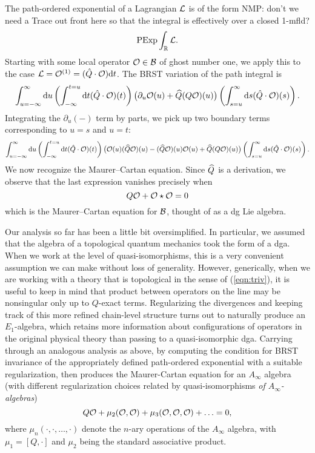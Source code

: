 \documentclass[11pt]{amsart}
\def\natalie#1{{\textcolor{green!65!black}{NMP: {#1}}}}
\begin{document}
The path-ordered exponential of a Lagrangian $\cL$ is of the form \natalie{don't we need a Trace out front here so that the integral is effectively over a closed 1-mfld?}
\[
\text{PExp} \int_\RR \cL .
\]
Starting with some local operator $\cO \in \cB$ of ghost number one, we apply this to the case $\cL = \cO^{(1)} = (\hat{Q} \cdot \cO) \d t$.
The BRST variation of the path integral is
\[
\int_{u=-\infty}^\infty \d u \left( \int_{-\infty}^{t = u} \d t (\hat{Q} \cdot \cO) (t) \right) \big(\partial_u \cO(u) + \Hat{Q} (Q \cO)(u) \big) \left( \int_{s=u}^{\infty} \d s (\hat{Q} \cdot \cO) (s) \right) .
\]
Integrating the $\partial_u(-)$ term by parts, we pick up two boundary terms corresponding to $u=s$ and $u=t$:
\[
\int_{u=-\infty}^\infty \d u \left( \int_{-\infty}^{t = u} \d t (\hat{Q} \cdot \cO) (t) \right) \big(\cO (u) (\Hat{Q}\cO) (u) - (\Hat{Q}\cO) (u) \cO (u) + \Hat{Q} (Q \cO)(u) \big) \left( \int_{s=u}^{\infty} \d s (\hat{Q} \cdot \cO) (s) \right) .
\]
We now recognize the Maurer--Cartan equation. 
Since $\Hat{Q}$ is a derivation, we observe that the last expression vanishes precisely when
\[
Q \cO + \cO \star \cO = 0 
\]
which is the Maurer--Cartan equation for $\cB$, thought of as a dg Lie algebra. 

Our analysis so far has been a little bit oversimplified. In particular, we assumed that the algebra of a topological quantum mechanics took the form of a dga. When we work at the level of quasi-isomorphisms, this is a very convenient assumption we can make without loss of generality. However, generically, when we are working with a theory that is topological in the sense of (\ref{eqn:triv}), it is useful to keep in mind that product between operators on the line may be nonsingular only up to $Q$-exact terms. Regularizing the divergences and keeping track of this more refined chain-level structure turns out to naturally produce an $E_1$-algebra, which retains more information about configurations of operators in the original physical theory than passing to a quasi-isomorphic dga. Carrying through an analogous analysis as above, by computing the condition for BRST invariance of the appropriately defined path-ordered exponential with a suitable regularization, then produces the Maurer-Cartan equation for an $A_{\infty}$ algebra (with different regularization choices related by quasi-isomorphisms \textit{of $A_{\infty}$-algebras})
\[
Q \cO + \mu_2(\cO, \cO) + \mu_3(\cO, \cO, \cO) + \ldots = 0,
\]
where $\mu_n(\cdot, \cdot, \ldots, \cdot)$ denote the $n$-ary operations of the $A_{\infty}$ algebra, with $\mu_1 = [Q, \cdot]$ and $\mu_2$ being the standard associative product.  
\end{document}
